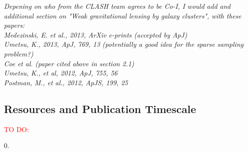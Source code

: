 \documentclass[12pt]{article}
\begin{document}
{\color{red}\it Depening on who from the CLASH team agrees to be Co-I, I would add and additional section on "Weak gravitational lensing by galaxy clusters", with these papers:\\
Medezinski, E. et al., 2013, ArXiv e-prints (accepted by ApJ)\\
Umetsu, K., 2013, ApJ, 769, 13 (potentially a good idea for the sparse sampling problem?)\\
Coe et al. (paper cited above in section 2.1)\\
Umetsu, K., et al, 2012, ApJ, 755, 56\\
Postman, M., et al., 2012, ApJS, 199, 25
} 


\subsection{Resources and Publication Timescale}
\textcolor{Red}{TO DO:}

\renewcommand{\bibfont}{\footnotesize}
\begin{spacing}{0.}


\end{spacing}
\end{document}
